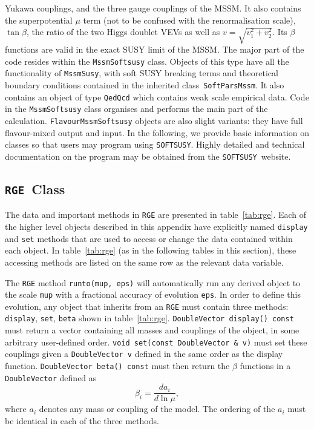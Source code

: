\documentclass{article}
\def\SOFTSUSY{{\tt SOFTSUSY}}
\def\code#1{\small{\tt #1}\normalsize}
\begin{document}
Yukawa couplings, and the three gauge couplings
of the MSSM\@. It also contains the superpotential $\mu$ term (not
to be confused with the renormalisation scale), $\tan \beta$, the ratio of
the two Higgs doublet VEVs as well as $v=\sqrt{v_1^2+v_2^2}$. Its $\beta$ functions are
valid in the exact SUSY limit of the MSSM\@. 
The major part of the code resides within the \code{MssmSoftsusy} class.
Objects of this type have
all the functionality of \code{MssmSusy}, with soft SUSY breaking terms 
and theoretical boundary conditions contained in the inherited
class~\code{SoftParsMssm}. 
It also contains an object of type \code{QedQcd} which contains weak scale
empirical data.
Code in the \code{MssmSoftsusy} class organises and performs the main part of
the calculation.
\code{FlavourMssmSoftsusy} objects are also slight variants: they have
full flavour-mixed output and input.
In the following, we provide basic information on classes so that users
may program using \SOFTSUSY\@. Highly detailed and technical
documentation on the program may be obtained from the \SOFTSUSY~website.

\subsection{\code{RGE}~Class}

The data and important methods in \code{RGE} are presented in
table~\ref{tab:rge}. 
Each of the higher level objects described in this appendix have explicitly
named \code{display} 
and \code{set} methods that are used to access or change the data contained
within each object. In table~\ref{tab:rge} (as in the following tables in
this section), these accessing methods are listed on the same row as the
relevant data variable. 

The \code{RGE} method \code{runto(mup, eps)} will automatically run any
derived object to the scale \code{mup} with a fractional accuracy of evolution
\code{eps}. In order to define this evolution, any object that inherits from an
{\tt RGE} must contain three methods: 
\code{display},
\code{set}, \code{beta} shown in table~\ref{tab:rge}. 
\code{DoubleVector display() const}
must return a vector containing all masses and couplings of the object, in some
arbitrary user-defined order. 
\code{void set(const DoubleVector \& v)} must set
these couplings given a 
\code{DoubleVector v} defined in the same order as the display function.
\code{DoubleVector beta() const} must then return the $\beta$ functions in a
\code{DoubleVector}  
defined as
\begin{equation}
\beta_i = \frac{d a_i}{d \ln \mu},
\end{equation}
where $a_i$ denotes any mass or coupling of the model. The ordering of the
$a_i$ must be identical in each of the three methods.
\end{document}
